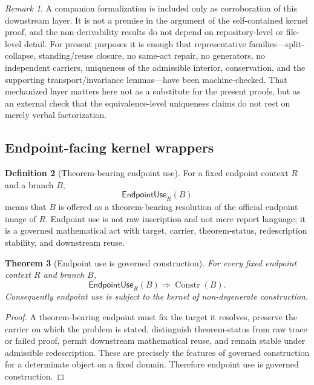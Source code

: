 \documentclass[11pt]{article}
\newtheorem{theorem}{Theorem}[section]
\theoremstyle{definition}
\newtheorem{definition}[theorem]{Definition}
\theoremstyle{remark}
\newtheorem{remark}[theorem]{Remark}
\newcommand{\Constr}{\operatorname{Constr}}
\newcommand{\EndpointUse}{\mathsf{EndpointUse}}
\begin{document}
\begin{remark}
A companion formalization is included only as corroboration of this downstream layer. It is not a premise in the argument of the self-contained kernel proof, and the non-derivability results do not depend on repository-level or file-level detail. For present purposes it is enough that representative families---split-collapse, standing/reuse closure, no same-act repair, no generators, no independent carriers, uniqueness of the admissible interior, conservation, and the supporting transport/invariance lemmas---have been machine-checked. That mechanized layer matters here not as a substitute for the present proofs, but as an external check that the equivalence-level uniqueness claims do not rest on merely verbal factorization.
\end{remark}



\subsection{Endpoint-facing kernel wrappers}\label{subsec:endpoint-facing-kernel-wrappers}

\begin{definition}[Theorem-bearing endpoint use]\label{def:endpoint-use}
For a fixed endpoint context \(R\) and a branch \(B\),
\[
  \EndpointUse_R(B)
\]
means that \(B\) is offered as a theorem-bearing resolution of the official endpoint image of \(R\). Endpoint use is not raw inscription and not mere report language; it is a governed mathematical act with target, carrier, theorem-status, redescription stability, and downstream reuse.
\end{definition}

\begin{theorem}[Endpoint use is governed construction]\label{thm:endpoint-use-governed}
For every fixed endpoint context \(R\) and branch \(B\),
\[
  \EndpointUse_R(B)\Rightarrow \Constr(B).
\]
Consequently endpoint use is subject to the kernel of non-degenerate construction.
\end{theorem}

\begin{proof}
A theorem-bearing endpoint must fix the target it resolves, preserve the carrier on which the problem is stated, distinguish theorem-status from raw trace or failed proof, permit downstream mathematical reuse, and remain stable under admissible redescription. These are precisely the features of governed construction for a determinate object on a fixed domain. Therefore endpoint use is governed construction.
\end{proof}
\end{document}
